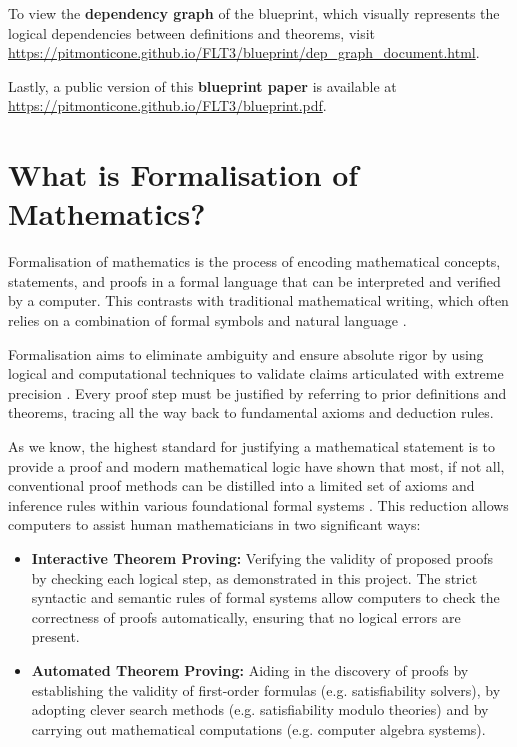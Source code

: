 To view the \textbf{dependency graph} of the blueprint, which visually represents the logical dependencies
between definitions and theorems, visit \url{https://pitmonticone.github.io/FLT3/blueprint/dep_graph_document.html}.

Lastly, a public version of this \textbf{blueprint paper} is available at \url{https://pitmonticone.github.io/FLT3/blueprint.pdf}.

\section{What is Formalisation of Mathematics?}

Formalisation of mathematics is the process of encoding mathematical concepts, statements, and proofs
in a formal language that can be interpreted and verified by a computer.
This contrasts with traditional mathematical writing, which often relies on a combination of formal
symbols and natural language \cite{Bourbaki2004} \cite{Avigad2023}.

Formalisation aims to eliminate ambiguity and ensure absolute rigor by using logical and computational
techniques to validate claims articulated with extreme precision \cite{Avigad2014} \cite{Avigad2018} \cite{Avigad2024}.
Every proof step must be justified by referring to prior definitions and theorems, tracing all the way
back to fundamental axioms and deduction rules.

As we know, the highest standard for justifying a mathematical statement is to provide a proof and modern
mathematical logic have shown that most, if not all, conventional
proof methods can be distilled into a limited set of axioms and inference rules within various
foundational formal systems \cite{Avigad2022}. This reduction allows computers to assist human mathematicians in two significant ways:

\begin{itemize}
    \item \textbf{Interactive Theorem Proving:} Verifying the validity of proposed proofs by checking each logical step,
    as demonstrated in this project. The strict syntactic and semantic rules of formal systems allow
    computers to check the correctness of proofs automatically, ensuring that no logical errors are present.
    \item \textbf{Automated Theorem Proving:} Aiding in the discovery of proofs by establishing the validity
    of first-order formulas (e.g. satisfiability solvers), by adopting clever search methods (e.g. satisfiability modulo theories)
    and by carrying out mathematical computations (e.g. computer algebra systems).
\end{itemize}

